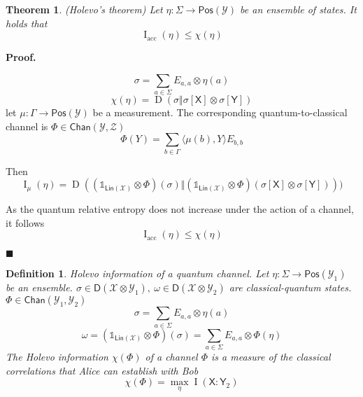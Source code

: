 \documentclass[aps,pra,onecolumn,notitlepage,superscriptaddress]{revtex4-1}
\newcommand{\reg}[1]{\mathsf{#1}}
\newcommand{\spc}[1]{\mathcal{#1}}
\newcommand{\Lin}{\mathsf{Lin}}
\newcommand{\Pos}{\mathsf{Pos}}
\newcommand{\D}{\mathsf{D}}
\def\>{\rangle}
\def\<{\langle}
\newcommand{\op}[1]{\operatorname{#1}}
\newcommand{\Chan}{{\mathsf{Chan}}}
\newcommand\I{\mathds{1}}
\newtheorem{theo}{Theorem}
\newtheorem{defi}{Definition}
\def\Proof{{\bf Proof.~}}
\def\qed{$\blacksquare$ \newline}
\begin{document}
    \begin{theo}
        (Holevo's theorem) Let $\eta : \Sigma \to \Pos(\spc Y)$ be an ensemble of states. It holds that
        \begin{equation}
            \op I_{\text{acc}}(\eta) \leq \chi(\eta)
        \end{equation}
    \end{theo}
    \Proof {
        \begin{equation}
            \sigma = \sum_{a \in \Sigma} E_{a,a} \otimes \eta(a)
        \end{equation} 
        \begin{equation}
            \chi(\eta) = \op D(\sigma \Vert \sigma[\reg X] \otimes \sigma[\reg Y])
        \end{equation}
        let $\mu : \Gamma \to \Pos(\spc Y)$ be a measurement. The corresponding quantum-to-classical channel is $\Phi \in \Chan(\spc Y,\spc Z)$
        \begin{equation}
            \Phi(Y) = \sum_{b \in \Gamma} \< \mu(b), Y \> E_{b,b}
        \end{equation}

        Then
        \begin{equation}
            \op I_{\mu}(\eta) = \op D((\I_{\Lin(\spc X)} \otimes \Phi) (\sigma) \Vert (\I_{\Lin(\spc X)} \otimes \Phi)(\sigma[\reg X] \otimes \sigma[\reg Y])) )
        \end{equation}

        As the quantum relative entropy does not increase under the action of a channel, it follows
        \begin{equation}
            \op I_{\text{acc}}(\eta) \leq \chi(\eta)
        \end{equation}
    }\qed

    \begin{defi}
        Holevo information of a quantum channel. Let $\eta : \Sigma \to \Pos(\spc Y_1)$ be an ensemble. $\sigma \in \D(\spc X \otimes \spc Y_1), \ \omega \in \D(\spc X \otimes \spc Y_2)$ are classical-quantum states. $\Phi \in \Chan(\spc Y_1, \spc Y_2)$
        \begin{equation}
            \sigma = \sum_{a \in \Sigma} E_{a,a} \otimes \eta(a)
        \end{equation}
        \begin{equation}
            \omega = (\I_{\Lin(\spc X)} \otimes \Phi)(\sigma) = \sum_{a \in \Sigma} E_{a,a} \otimes \Phi(\eta)
        \end{equation}
        The Holevo information $\chi(\Phi)$ of a channel $\Phi$ is a measure of the classical correlations that Alice can establish with Bob
        \begin{equation}
            \chi(\Phi) = \max_{\eta} \op I(\reg X : \reg Y_2)
        \end{equation}
    \end{defi}
\end{document}
